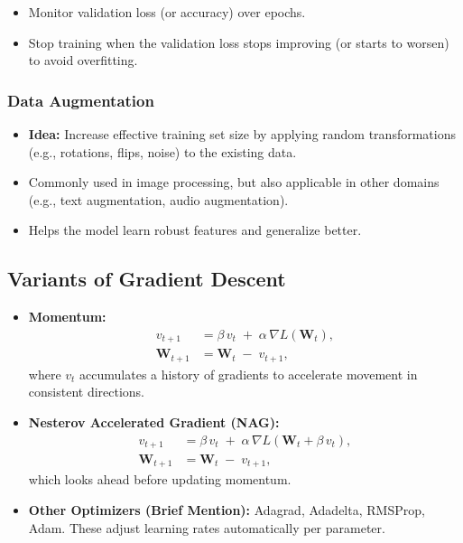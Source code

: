 \documentclass{article}
\begin{document}
\begin{itemize}
    \item Monitor validation loss (or accuracy) over epochs.
    \item Stop training when the validation loss stops improving (or starts to worsen) to avoid overfitting.
\end{itemize}

\subsubsection{Data Augmentation}

\begin{itemize}
    \item \textbf{Idea:} Increase effective training set size by applying random transformations (e.g., rotations, flips, noise) to the existing data.
    \item Commonly used in image processing, but also applicable in other domains (e.g., text augmentation, audio augmentation).
    \item Helps the model learn robust features and generalize better.
\end{itemize}

\subsection{Variants of Gradient Descent}

\begin{itemize}
    \item \textbf{Momentum:} 
    \[
    \begin{aligned}
    v_{t+1} &= \beta \, v_{t} \;+\;\alpha\, \nabla L(\mathbf{W}_t),\\
    \mathbf{W}_{t+1} &= \mathbf{W}_t \;-\; v_{t+1},
    \end{aligned}
    \]
    where $v_t$ accumulates a history of gradients to accelerate movement in consistent directions.
    \item \textbf{Nesterov Accelerated Gradient (NAG):} 
    \[
    \begin{aligned}
    v_{t+1} &= \beta \, v_{t} \;+\;\alpha\, \nabla L(\mathbf{W}_t + \beta\,v_t),\\
    \mathbf{W}_{t+1} &= \mathbf{W}_t \;-\; v_{t+1},
    \end{aligned}
    \]
    which looks ahead before updating momentum.
    \item \textbf{Other Optimizers (Brief Mention):} Adagrad, Adadelta, RMSProp, Adam. These adjust learning rates automatically per parameter.
\end{itemize}
\end{document}
